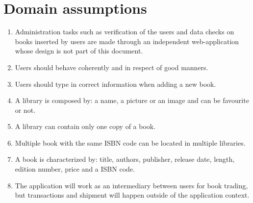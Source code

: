 \section{Domain assumptions}
\begin{enumerate}
    \item Administration tasks such as verification of the users and data checks on books inserted by users are made through an independent web-application whose design is not part of this document.
    \item Users should behave coherently and in respect of good manners.
    \item Users should type in correct information when adding a new book.
    \item A library is composed by: a name, a picture or an image and can be favourite or not.    
    \item A library can contain only one copy of a book.
    \item Multiple book with the same ISBN code can be located in multiple libraries.
    \item A book is characterized by: title, authors, publisher, release date, length, edition number, price and a ISBN code.
    \item The application will work as an intermediary between users for book trading, but transactions and shipment will happen outside of the application context.
\end{enumerate}

